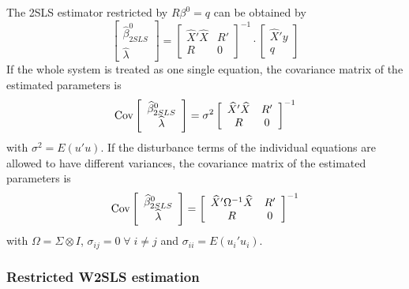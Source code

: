 The 2SLS estimator restricted by $R \beta^0 = q$ can be obtained by
\begin{equation}
   \left[ \begin{array}{c}
      \widehat{\beta}^0_{2SLS} \\ \widehat{\lambda}
   \end{array} \right]
   =
   \left[ \begin{array}{cc}
      \widehat{X}' \widehat{X} & R' \\ 
      R & 0
   \end{array} \right]^{-1}
   \cdot
   \left[ \begin{array}{c}
      \widehat{X}' y \\ q 
   \end{array} \right]
   \label{eq:beta2SLSr}
\end{equation}
If the whole system is treated as one single equation,
the covariance matrix of the estimated parameters is
\begin{equation}
   \text{Cov} 
   \left[ \begin{array}{c}
      \widehat{\beta}^0_{2SLS} \\ \widehat{\lambda}
   \end{array} \right] 
   = \sigma^2 
   \left[ \begin{array}{cc}
      \widehat{X}' \widehat{X} & R' \\ 
      R & 0
   \end{array} \right]^{-1}
\end{equation}
with $\sigma^2 = E \left( u' u \right)$.
If the disturbance terms of the individual equations
are allowed to have different variances, 
the covariance matrix of the estimated parameters is
\begin{equation}
   \text{Cov} 
   \left[ \begin{array}{c}
      \widehat{\beta}^0_{2SLS} \\ \widehat{\lambda}
   \end{array} \right] 
   = 
   \left[ \begin{array}{cc}
      \widehat{X}' \Omega^{-1} \widehat{X} & R' \\ 
      R & 0
   \end{array} \right]^{-1}
\end{equation}
with $\Omega = \Sigma \otimes I$, 
$\sigma_{ij} = 0 \; \forall \; i \neq j$ and
$\sigma_{ii} = E \left( u_i' u_i \right)$.


\subsubsection{Restricted W2SLS estimation}

